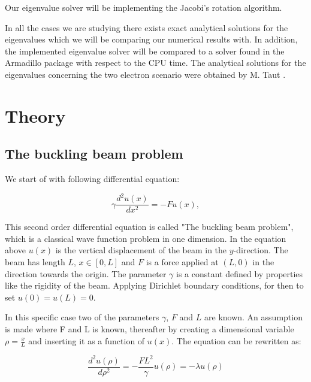 \documentclass[twoside,onecolumn]{article}
\begin{document}

Our eigenvalue solver will be implementing the Jacobi's rotation algorithm.


\bigskip

In all the cases we are studying there exists exact analytical solutions for the eigenvalues which we will be comparing our numerical results with. In addition, the implemented eigenvalue solver will be compared to a solver found in the Armadillo\cite{Sanderson2019}\cite{Saddler1971} package with respect to the CPU time. The analytical solutions for the eigenvalues concerning the two electron scenario were obtained by M. Taut \cite{taut}.  

\section{Theory}

\subsection{The buckling beam problem}
We start of with following differential equation: 

\begin{equation*}
\gamma \frac{d^2 u(x)}{dx^2} = -F u(x),
\end{equation*}

\bigskip

This second order differential equation is called "The buckling beam problem", which is a classical wave function problem in one dimension. In the equation above $u(x)$ is the vertical displacement of the beam in the $y$-direction. The beam has length $L$, $x\in [0,L]$ and $F$ is a force applied at $(L,0)$ in the direction towards the origin. The parameter $\gamma$ is a constant defined by properties like the rigidity of the beam. Applying Dirichlet boundary conditions, for then to set $u(0)=u(L)=0$.

\bigskip

In this specific case two of the  parameters $\gamma$, $F$ and $L$ are known. An assumption is made where F and L is known, thereafter by creating a dimensional variable $\rho = \frac{x}{L}$ and inserting it as a function of $u(x)$. The equation can be rewritten as: 

\bigskip

\begin{equation}
 \frac{d^2 u(\rho)}{d\rho^2} = -\frac{FL^2}{\gamma} u(\rho)=-\lambda u(\rho)
\end{equation}
\end{document}
